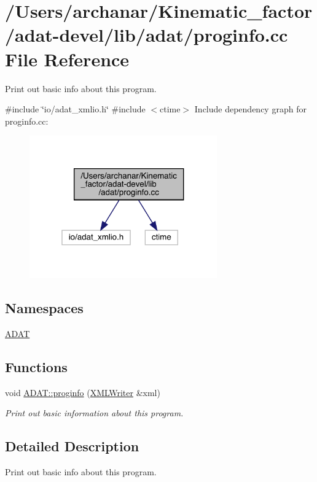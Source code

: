 \hypertarget{adat-devel_2lib_2adat_2proginfo_8cc}{}\section{/\+Users/archanar/\+Kinematic\+\_\+factor/adat-\/devel/lib/adat/proginfo.cc File Reference}
\label{adat-devel_2lib_2adat_2proginfo_8cc}


Print out basic info about this program.  


{\ttfamily \#include \char`\"{}io/adat\+\_\+xmlio.\+h\char`\"{}}\newline
{\ttfamily \#include $<$ctime$>$}\newline
Include dependency graph for proginfo.\+cc\+:
\nopagebreak
\begin{figure}[H]
\begin{center}
\leavevmode
\includegraphics[width=229pt]{d2/d6e/adat-devel_2lib_2adat_2proginfo_8cc__incl}
\end{center}
\end{figure}
\subsection*{Namespaces}
\begin{DoxyCompactItemize}
\item 
 \mbox{\hyperlink{namespaceADAT}{A\+D\+AT}}
\end{DoxyCompactItemize}
\subsection*{Functions}
\begin{DoxyCompactItemize}
\item 
void \mbox{\hyperlink{namespaceADAT_a93a8baf56c435bc0fe7bd252601f28f6}{A\+D\+A\+T\+::proginfo}} (\mbox{\hyperlink{classADATXML_1_1XMLWriter}{X\+M\+L\+Writer}} \&xml)
\begin{DoxyCompactList}\small\item\em Print out basic information about this program. \end{DoxyCompactList}\end{DoxyCompactItemize}


\subsection{Detailed Description}
Print out basic info about this program. 

